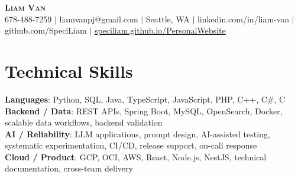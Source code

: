 \documentclass[letterpaper,11pt]{article}
\begin{document}

%
\begin{center}
    \textbf{\Huge \scshape Liam Van} \\ \vspace{1pt}
    \small 678-488-7259 $|$ \small {liamvanpj@gmail.com} $|$ Seattle, WA
 {{$|$ linkedin.com/in/liam-van} {$|$ github.com/SpeciLiam} {$|$ \href{https://speciliam.github.io/PersonalWebsite}{speciliam.github.io/PersonalWebsite}}}

\end{center}

\section{Technical Skills}
 \begin{itemize}[leftmargin=0.15in, label={}]
    \small{\item{
     \textbf{Languages}{: Python, SQL, Java, TypeScript, JavaScript, PHP, C++, C\#, C} \\
     \textbf{Backend / Data}{: REST APIs, Spring Boot, MySQL, OpenSearch, Docker, scalable data workflows, backend validation} \\
     \textbf{AI / Reliability}{: LLM applications, prompt design, AI-assisted testing, systematic experimentation, CI/CD, release support, on-call response} \\
     \textbf{Cloud / Product}{: GCP, OCI, AWS, React, Node.js, NestJS, technical documentation, cross-team delivery} \\
    }}
 \end{itemize}
%
\end{document}
